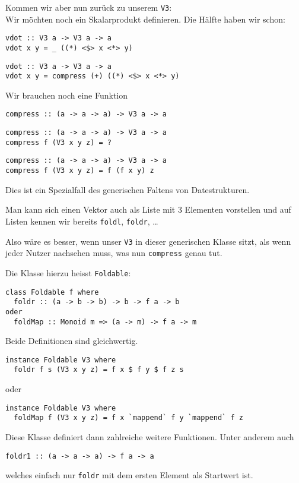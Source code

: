 \documentclass{beamer}
\begin{document}
\begin{frame}[fragile]
Kommen wir aber nun zurück zu unserem \texttt{V3}:\\
Wir möchten noch ein Skalarprodukt definieren. Die Hälfte haben wir schon:
\begin{overprint}
\begin{verbatim}
vdot :: V3 a -> V3 a -> a
vdot x y = _ ((*) <$> x <*> y)
\end{verbatim}
\begin{verbatim}
vdot :: V3 a -> V3 a -> a
vdot x y = compress (+) ((*) <$> x <*> y)
\end{verbatim}
\end{overprint}
\pause
Wir brauchen noch eine Funktion
\begin{overprint}
\begin{verbatim}
compress :: (a -> a -> a) -> V3 a -> a
\end{verbatim}
\begin{verbatim}
compress :: (a -> a -> a) -> V3 a -> a
compress f (V3 x y z) = ?
\end{verbatim}
\begin{verbatim}
compress :: (a -> a -> a) -> V3 a -> a
compress f (V3 x y z) = f (f x y) z
\end{verbatim}
\end{overprint}
\pause
\pause
\pause
\pause
Dies ist ein Spezialfall des generischen Faltens von Datestrukturen.\\\par
\pause
Man kann sich einen Vektor auch als Liste mit 3 Elementen vorstellen und auf Listen kennen wir bereits \texttt{foldl}, \texttt{foldr}, \dots
\\\par \pause
Also wäre es besser, wenn unser \texttt{V3} in dieser generischen Klasse sitzt, als wenn jeder Nutzer nachsehen muss, was nun \texttt{compress} genau tut.
\end{frame}

\begin{frame}[fragile]
Die Klasse hierzu heisst \texttt{Foldable}:
\begin{verbatim}
class Foldable f where
  foldr :: (a -> b -> b) -> b -> f a -> b
oder
  foldMap :: Monoid m => (a -> m) -> f a -> m
\end{verbatim}
\pause
Beide Definitionen sind gleichwertig.
\pause
\begin{verbatim}
instance Foldable V3 where
  foldr f s (V3 x y z) = f x $ f y $ f z s
\end{verbatim}
\pause
oder
\begin{verbatim}
instance Foldable V3 where
  foldMap f (V3 x y z) = f x `mappend` f y `mappend` f z
\end{verbatim}
\pause
Diese Klasse definiert dann zahlreiche weitere Funktionen. Unter anderem auch
\begin{verbatim}
foldr1 :: (a -> a -> a) -> f a -> a
\end{verbatim}
welches einfach nur \texttt{foldr} mit dem ersten Element als Startwert ist.
\end{frame}
\end{document}
